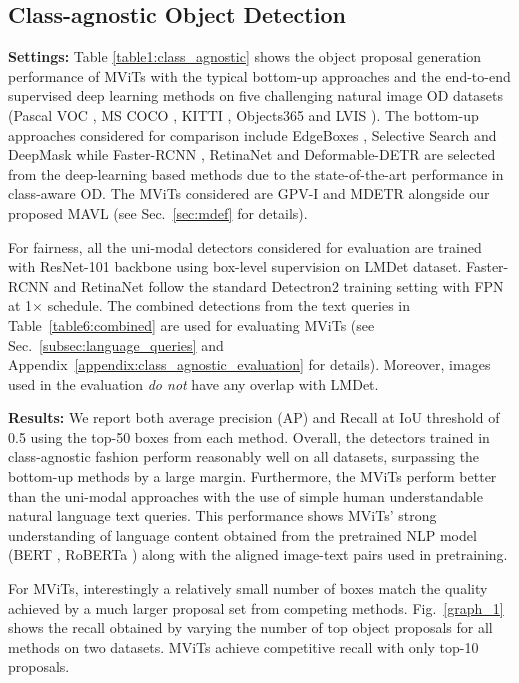 \documentclass[runningheads]{llncs}
\begin{document}
\subsection{Class-agnostic Object Detection}\label{sec:class-agnostic}
\textbf{Settings:}
Table \ref{table1:class_agnostic} shows the object proposal generation performance of MViTs with the typical bottom-up approaches and the end-to-end supervised deep learning methods on five  challenging natural image OD datasets (Pascal VOC \cite{voc}, MS COCO \cite{coco}, KITTI \cite{kitti}, {Objects365 \cite{shao2019objects365} and LVIS \cite{gupta2019lvis}}). The bottom-up approaches considered for comparison include EdgeBoxes \cite{zitnick2014edge}, Selective Search \cite{uijlings2013selective} and DeepMask \cite{pinheiro2015learning} while Faster-RCNN \cite{ren2015faster}, RetinaNet \cite{lin2017focal} and Deformable-DETR \cite{zhu2020deformable} are selected from the deep-learning based methods due to the state-of-the-art performance in class-aware OD. The MViTs considered are GPV-I \cite{gpv1} and MDETR \cite{mdetr} alongside our proposed MAVL (see Sec.~\ref{sec:mdef} for details). 

For fairness, all the uni-modal detectors considered for evaluation are trained with ResNet-101 backbone using box-level supervision on {LMDet} dataset. Faster-RCNN and RetinaNet follow the standard Detectron2 \cite{wu2019detectron2} training setting with FPN at 1$\times$ schedule. {The combined detections from the text queries in Table~\ref{table6:combined} are used for evaluating MViTs (see Sec.~\ref{subsec:language_queries} and Appendix~\ref{appendix:class_agnostic_evaluation} for details).} Moreover, images used in the evaluation \emph{do not} have any overlap with LMDet.

\noindent\textbf{Results:} We report both average precision (AP) and Recall at IoU threshold of 0.5 using the top-50 boxes from each method. Overall, the detectors trained in class-agnostic fashion perform reasonably well on all datasets, surpassing the bottom-up methods by a large margin. Furthermore, the MViTs perform better than the uni-modal approaches with the use of simple human understandable natural language text queries. This performance shows MViTs' strong understanding of language content obtained from the pretrained NLP model (BERT \cite{BERT}, RoBERTa \cite{roberta}) along with the aligned image-text pairs used in pretraining.

For MViTs, interestingly a relatively small number of boxes match the quality achieved by a much larger proposal set
from competing methods. Fig.~\ref{graph_1} shows the recall
obtained by varying the number of top object proposals for all methods on two datasets. MViTs achieve competitive recall
with only top-10 proposals.
\end{document}
